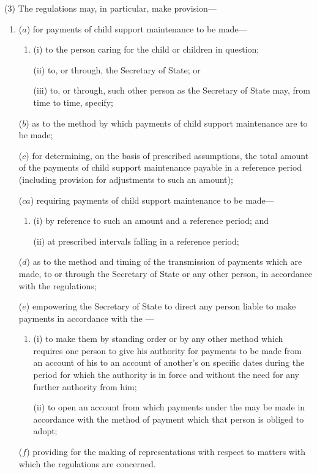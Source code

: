 \documentclass[12pt,a4paper]{article}
\begin{document}
(3) The regulations may, in particular, make provision---
\begin{enumerate}\item[]
($a$) for payments of child support maintenance to be made---
\begin{enumerate}\item[]
(i) to the person caring for the child or children in question;

(ii) to, or through, the Secretary of State; or

(iii) to, or through, such other person as the Secretary of State may, from
time to time, specify;
\end{enumerate}

($b$) as to the method by which payments of child support maintenance are to
be made;

($c$) for determining, on the basis of prescribed assumptions, the total amount of the payments of child support maintenance payable in a reference period (including provision for adjustments to such an amount);

($ca$) requiring payments of child support maintenance to be made—
\begin{enumerate}\item[]
(i) by reference to such an amount and a reference period; and

(ii) at prescribed intervals falling in a reference period;
\end{enumerate}

($d$) as to the method and timing of the transmission of payments which are
made, to or through the Secretary of State or any other person, in accordance
with the regulations;

($e$) empowering the Secretary of State to direct any person liable to make
payments in accordance with the ---
\begin{enumerate}\item[]
(i) to make them by standing order or by any other method which
requires one person to give his authority for payments to be made
from an account of his to an account of another’s on specific dates
during the period for which the authority is in force and without the
need for any further authority from him;

(ii) to open an account from which payments under the  may be made in accordance with the method of payment
which that person is obliged to adopt;
\end{enumerate}

($f$) providing for the making of representations with respect to matters with
which the regulations are concerned.
\end{enumerate}
\end{document}
